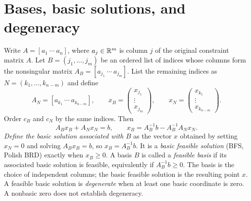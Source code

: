 \documentclass[11pt,a4paper]{article}
\begin{document}
\Needspace{14cm}
\section{Bases, basic solutions, and degeneracy}\label{sec:bases}
Write $A=[a_1\ \cdots\ a_n]$, where $a_j\in\mathbb{R}^m$ is column $j$ of the
original constraint matrix $A$. Let $B=(j_1,\ldots,j_m)$ be an ordered list of
indices whose columns form the nonsingular matrix
$A_B=[a_{j_1}\ \cdots\ a_{j_m}]$. List the remaining indices as
$N=(k_1,\ldots,k_{n-m})$ and define
\[
  A_N=[a_{k_1}\ \cdots\ a_{k_{n-m}}],\qquad
  x_B=\begin{pmatrix}x_{j_1}\\\vdots\\x_{j_m}\end{pmatrix},\qquad
  x_N=\begin{pmatrix}x_{k_1}\\\vdots\\x_{k_{n-m}}\end{pmatrix}.
\]
Order $c_B$ and $c_N$ by the same indices. Then
\[
  A_Bx_B+A_Nx_N=b,
  \qquad x_B=A_B^{-1}b-A_B^{-1}A_Nx_N.
\]
\emph{Define the basic solution associated with $B$} as the vector $x$ obtained
by setting $x_N=0$ and solving $A_Bx_B=b$, so $x_B=A_B^{-1}b$.
It is a \emph{basic feasible solution} (BFS, Polish BRD) exactly
when $x_B\geq0$. A basis $B$ is called a \emph{feasible basis} if its
associated basic solution is feasible, equivalently if $A_B^{-1}b\geq0$.
The basis is the choice of independent columns; the basic feasible solution
is the resulting point $x$.
A feasible basic solution is \emph{degenerate} when at least
one basic coordinate is zero. A nonbasic zero does not establish degeneracy.
\end{document}
